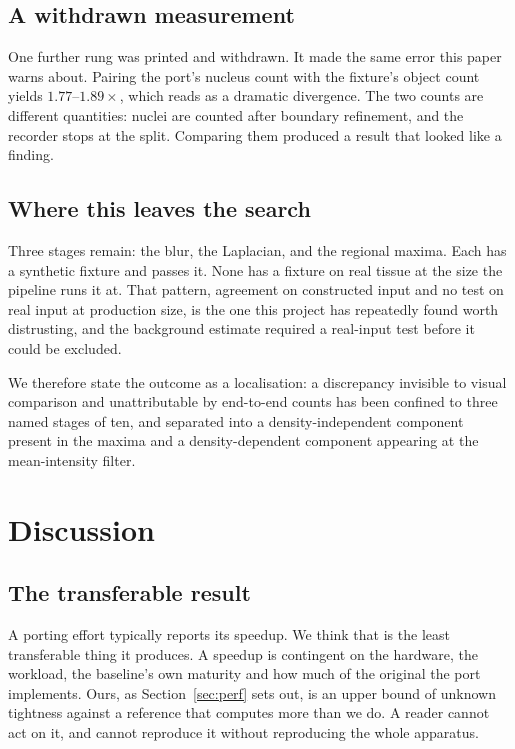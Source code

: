 \documentclass[11pt,a4paper]{article}
\begin{document}
\subsection{A withdrawn measurement}

One further rung was printed and withdrawn. It made the same error this paper
warns about. Pairing the port's nucleus count with the fixture's object count
yields $1.77$--$1.89\times$, which reads as a dramatic divergence. The two
counts are different quantities: nuclei are counted after boundary refinement,
and the recorder stops at the split. Comparing them produced a result that
looked like a finding.

\subsection{Where this leaves the search}

Three stages remain: the blur, the Laplacian, and the regional maxima. Each has
a synthetic fixture and passes it. None has a fixture on real tissue at the
size the pipeline runs it at. That pattern, agreement on constructed input and
no test on real input at production size, is the one this project has
repeatedly found worth distrusting, and the background estimate required a
real-input test before it could be excluded.

We therefore state the outcome as a localisation: a discrepancy invisible to
visual comparison and unattributable by end-to-end counts has been confined to
three named stages of ten, and separated into a density-independent component
present in the maxima and a density-dependent component appearing at the
mean-intensity filter.

\section{Discussion}
\label{sec:discussion}

\subsection{The transferable result}

A porting effort typically reports its speedup. We think that is the least
transferable thing it produces. A speedup is contingent on the hardware, the
workload, the baseline's own maturity and how much of the original the port
implements. Ours, as Section~\ref{sec:perf} sets out, is an upper bound of
unknown tightness against a reference that computes more than we do. A reader
cannot act on it, and cannot reproduce it without reproducing the whole
apparatus.
\end{document}

